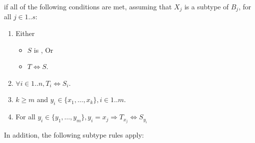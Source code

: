 \documentclass{article}
\begin{document}
\noindent
if all of the following conditions are met,
assuming that $X_j$ is a subtype of $B_j$, for all $j \in 1 .. s$:
\begin{enumerate}
\item Either
\begin{itemize}
\item $S$ is \VOID{}, Or
\item $T \Longleftrightarrow S$.
\end{itemize}
\item $\forall i \in 1 .. n, T_i \Longleftrightarrow S_i$.
\item $k \ge m$ and $y_i \in \{x_1, \ldots, x_k\}, i \in 1 .. m$.
\item For all $y_i \in \{y_1, \ldots, y_m\}, y_i = x_j \Rightarrow T_{x_j} \Longleftrightarrow S_{y_i}$
\end{enumerate}





\LMHash{}
In addition, the following subtype rules apply:


\end{document}
